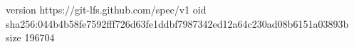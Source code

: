 version https://git-lfs.github.com/spec/v1
oid sha256:044b4b58fe7592fff726d63fe1ddbf7987342ed12a64c230ad08b6151a03893b
size 196704
